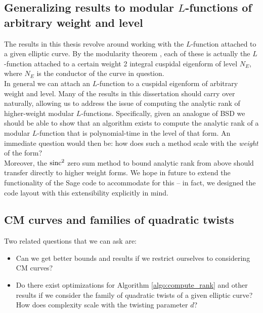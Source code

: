 \subsection{Generalizing results to modular $L$-functions of arbitrary weight and level}

The results in this thesis revolve around working with the $L$-function attached to a given elliptic curve. By the modularity theorem \cite{BCDT-2011}, each of these is actually the $L$-function attached to a certain weight 2 integral cuspidal eigenform of level $N_E$, where $N_E$ is the conductor of the curve in question. \\

In general we can attach an $L$-function to a cuspidal eigenform of arbitrary weight and level. Many of the results in this dissertation should carry over naturally, allowing us to address the issue of computing the analytic rank of higher-weight modular $L$-functions. Specifically, given an analogue of BSD we should be able to show that an algorithm exists to compute the analytic rank of a modular $L$-function that is polynomial-time in the level of that form. An immediate question would then be: how does such a method scale with the {\it weight} of the form? \\

Moreover, the $\operatorname{sinc}^2$ zero sum method to bound analytic rank from above should transfer directly to higher weight forms. We hope in future to extend the functionality of the Sage code to accommodate for this -- in fact, we designed the code layout with this extensibility explicitly in mind.

\subsection{CM curves and families of quadratic twists}

Two related questions that we can ask are:
\begin{itemize}
\item Can we get better bounds and results if we restrict ourselves to considering CM curves?
\item Do there exist optimizations for Algorithm \ref{algo:compute_rank} and other results if we consider the family of quadratic twists of a given elliptic curve? How does complexity scale with the twisting parameter $d$?
\end{itemize}

